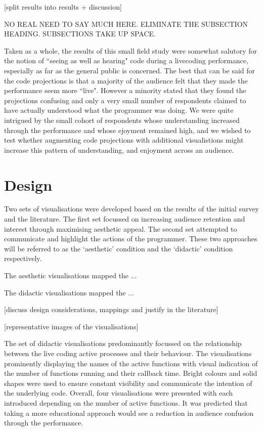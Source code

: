 \documentclass{sig-alternate}
\begin{document}

{\color{red}[split results into results + discussion]}



NO REAL NEED TO SAY MUCH HERE. ELIMINATE THE SUBSECTION HEADING. SUBSECTIONS TAKE UP SPACE.

Taken as a whole, the results of this small field study were somewhat salutory for the notion of ``seeing as well as hearing" code during a livecoding performance, especially as far as the general public is concerned. The best that can be said for the code projections is that a majority of the audience felt that they made the performance seem more ``live". However a minority stated that they found the projections confusing and only a very small number of respondents claimed to have actually understood what the programmer was doing. We were quite intrigued by the small cohort of respondents whose understanding increased through the performance and whose ejoyment remained high, and we wished to test whether augmenting code projections with additional visualistions might increase this pattern of understanding, and enjoyment across an audience. 

\section{Design}

Two sets of visualisations were developed based on the results of the initial survey and the literature. The first set focussed on increasing audience retention and interest through maximising aesthetic appeal. The second set attempted to communicate and highlight the actions of the programmer. These two approaches will be referred to as the `aesthetic' condition and the `didactic' condition respectively.

The aesthetic visualisations mapped the ...

The didactic visualisations mapped the ...

{\color{red}[discuss design considerations, mappings and justify in the literature]}

{\color{red}[representative images of the visualisations]}

The set of didactic visualisations predominantly focussed on the relationship between the live coding active processes and their behaviour. The visualisations prominently displaying the names of the active functions with visual indication of the number of functions running and their callback time. Bright colours and solid shapes were used to ensure constant visibility and communicate the intention of the underlying code. Overall, four visualisations were presented with each introduced depending on the number of active functions. It was predicted that taking a more educational approach would see a reduction in audience confusion through the performance.
\end{document}
